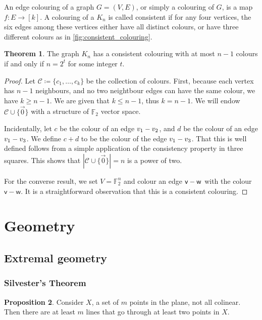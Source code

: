 \documentclass[12pt]{amsart}
\theoremstyle{definition}
\newtheorem{thm}{Theorem}[section]
\newtheorem{prop}[thm]{Proposition}
\newcommand{\F}{\mathbb{F}}
\newcommand{\CC}{\mathcal C}
\newcommand{\vv}{\mathsf{v}}
\newcommand{\vw}{\mathsf{w}}
\begin{document}
An edge colouring of a graph $G = (V, E)$, or simply a colouring of $G$, is a map $f:E \to [k]$.
A colouring of a $K_n$ is called consistent if for any four vertices, the six edges among these vertices either have all distinct colours, or have three different colours as in \cref{fig:consistent_colouring}.



\begin{thm}
The graph $K_n$ has a consistent colouring with at most $n-1$ colours if and only if $n = 2^t $ for some integer $t$.
\end{thm}

\begin{proof}
Let $\CC \coloneqq\{ c_1, \dots, c_k\}$ be the collection of colours.
First, because each vertex has $n-1$ neighbours, and no two neightbour edges can have the same colour, we have $k \geq n-1$.
We are given that $k \leq n-1$, thus $k = n-1$. 
We will endow $\CC \cup \{\vec{0}\}$ with a structure of $\F_2$ vector space.

Incidentally, let $c$ be the colour of an edge $v_1 \-- v_2$, and $d$ be the colour of an edge $v_1 \-- v_3$.
We define $c + d $ to be the colour of the edge $v_1 \-- v_3$.
That this is well defined follows from a simple application of the consistency property in three squares.
This shows that $|\CC \cup \{\vec{0}\}| = n$ is a power of two.

For the converse result, we set $V = \F_2^n$ and colour an edge $\vv \-- \vw$ with the colour $\vv - \vw$.
It is a straightforward observation that this is a consistent colouring.
\end{proof}



\section{Geometry}

\subsection{Extremal geometry}

\subsubsection*{Silvester's Theorem}

\begin{prop}
Consider $X$, a set of $m$ points in the plane, not all colinear.
Then there are at least $m$ lines that go through at least two points in $X$.
\end{prop}
\end{document}
